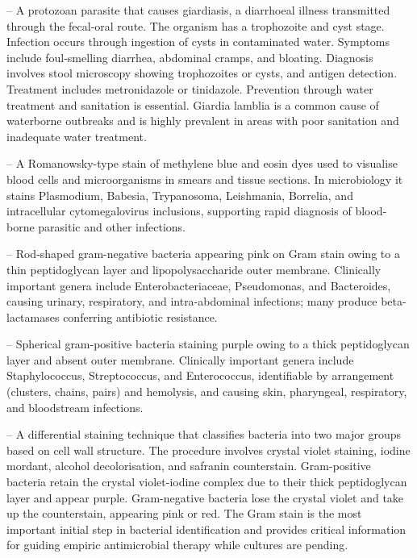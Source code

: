 -- A protozoan parasite that causes giardiasis, a diarrhoeal illness transmitted through the fecal-oral route. The organism has a trophozoite and cyst stage. Infection occurs through ingestion of cysts in contaminated water. Symptoms include foul-smelling diarrhea, abdominal cramps, and bloating. Diagnosis involves stool microscopy showing trophozoites or cysts, and antigen detection. Treatment includes metronidazole or tinidazole. Prevention through water treatment and sanitation is essential. Giardia lamblia is a common cause of waterborne outbreaks and is highly prevalent in areas with poor sanitation and inadequate water treatment.

-- A Romanowsky-type stain of methylene blue and eosin dyes used to visualise blood cells and microorganisms in smears and tissue sections. In microbiology it stains Plasmodium, Babesia, Trypanosoma, Leishmania, Borrelia, and intracellular cytomegalovirus inclusions, supporting rapid diagnosis of blood-borne parasitic and other infections.

-- Rod-shaped gram-negative bacteria appearing pink on Gram stain owing to a thin peptidoglycan layer and lipopolysaccharide outer membrane. Clinically important genera include Enterobacteriaceae, Pseudomonas, and Bacteroides, causing urinary, respiratory, and intra-abdominal infections; many produce beta-lactamases conferring antibiotic resistance.

-- Spherical gram-positive bacteria staining purple owing to a thick peptidoglycan layer and absent outer membrane. Clinically important genera include Staphylococcus, Streptococcus, and Enterococcus, identifiable by arrangement (clusters, chains, pairs) and hemolysis, and causing skin, pharyngeal, respiratory, and bloodstream infections.

-- A differential staining technique that classifies bacteria into two major groups based on cell wall structure. The procedure involves crystal violet staining, iodine mordant, alcohol decolorisation, and safranin counterstain. Gram-positive bacteria retain the crystal violet-iodine complex due to their thick peptidoglycan layer and appear purple. Gram-negative bacteria lose the crystal violet and take up the counterstain, appearing pink or red. The Gram stain is the most important initial step in bacterial identification and provides critical information for guiding empiric antimicrobial therapy while cultures are pending.

